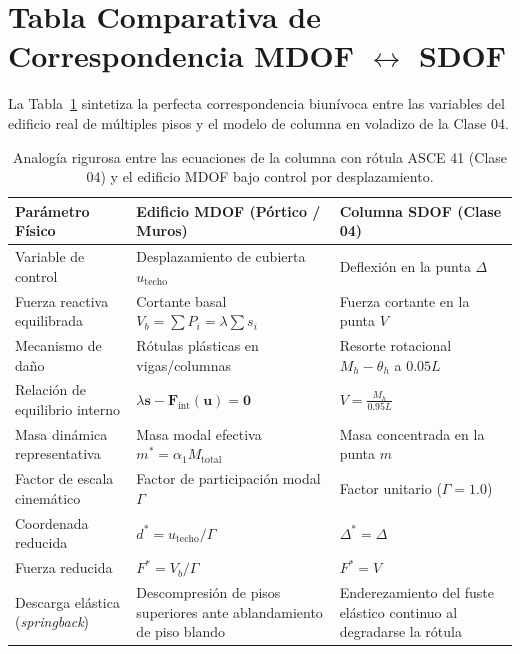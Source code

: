 \documentclass[11pt,letterpaper]{article}
\begin{document}
\section{Tabla Comparativa de Correspondencia MDOF \texorpdfstring{$\longleftrightarrow$}{<->} SDOF}

La Tabla~\ref{tab:equivalencia_mdof_sdof} sintetiza la perfecta correspondencia biunívoca entre las variables del edificio real de múltiples pisos y el modelo de columna en voladizo de la Clase 04.

\begin{table}[htbp]
\centering
\small
\renewcommand{\arraystretch}{1.3}
\begin{tabularx}{\textwidth}{>{\raggedright\arraybackslash}p{3.8cm}>{\raggedright\arraybackslash}X>{\raggedright\arraybackslash}X}
\toprule
\textbf{Parámetro Físico} & \textbf{Edificio MDOF (Pórtico / Muros)} & \textbf{Columna SDOF (Clase 04)} \\
\midrule
Variable de control & Desplazamiento de cubierta $u_{\text{techo}}$ & Deflexión en la punta $\Delta$ \\
Fuerza reactiva equilibrada & Cortante basal $V_b = \sum P_i = \lambda \sum s_i$ & Fuerza cortante en la punta $V$ \\
Mecanismo de daño & Rótulas plásticas en vigas/columnas & Resorte rotacional $M_h - \theta_h$ a $0.05 L$ \\
Relación de equilibrio interno & $\lambda \mathbf{s} - \mathbf{F}_{\text{int}}(\mathbf{u}) = \mathbf{0}$ & $V = \frac{M_h}{0.95 L}$ \\
Masa dinámica representativa & Masa modal efectiva $m^* = \alpha_1 M_{\text{total}}$ & Masa concentrada en la punta $m$ \\
Factor de escala cinemático & Factor de participación modal $\Gamma$ & Factor unitario ($\Gamma = 1.0$) \\
Coordenada reducida & $d^* = u_{\text{techo}} / \Gamma$ & $\Delta^* = \Delta$ \\
Fuerza reducida & $F^* = V_b / \Gamma$ & $F^* = V$ \\
Descarga elástica (\textit{springback}) & Descompresión de pisos superiores ante ablandamiento de piso blando & Enderezamiento del fuste elástico continuo al degradarse la rótula \\
\bottomrule
\end{tabularx}
\caption{Analogía rigurosa entre las ecuaciones de la columna con rótula ASCE 41 (Clase 04) y el edificio MDOF bajo control por desplazamiento.}
\label{tab:equivalencia_mdof_sdof}
\end{table}
\end{document}
